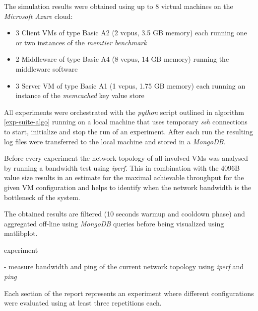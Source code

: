 \documentclass[11pt,a4paper]{article}
\begin{document}
The simulation results were obtained using up to 8 virtual machines on the \emph{Microsoft Azure} cloud:
\begin{itemize}
	\item 3 Client VMs of type Basic A2 (2 vcpus, 3.5 GB memory) each running one or two instances of the \emph{memtier benchmark}
	\item 2 Middleware of type Basic A4 (8 vcpus, 14 GB memory) running the middleware software
	\item 3 Server VM of type Basic A1 (1 vcpus, 1.75 GB memory) each running an instance of the \emph{memcached} key value store
\end{itemize}

All experiments were orchestrated with the \emph{python} script outlined in algorithm \ref{exp-suite-algo} running on a local machine that uses temporary \emph{ssh} connections to start, initialize and stop the run of an experiment. After each run  the resulting log files were transferred to the local machine and stored in a \emph{MongoDB}.
 
Before every experiment the network topology of all involved VMs was analysed by running a bandwidth test using \emph{iperf}. This in combination with the 4096B value size results in an estimate for the maximal achievable throughput for the given VM configuration and helps to identify when the network bandwidth is the bottleneck of the system.

The obtained results are filtered (10 seconds warmup and cooldown phase) and aggregated off-line using \emph{MongoDB} queries before being visualized using matlibplot.

\begin{algorithm}
	\ForEach
	{
		experiment
	}{
		- measure bandwidth and ping of the current network topology using \emph{iperf} and \emph{ping}
		
	}
	\caption{Each section of the report represents an experiment where different configurations were evaluated using at least three repetitions each.}\label{exp-suite-algo}
\end{algorithm}
\end{document}
